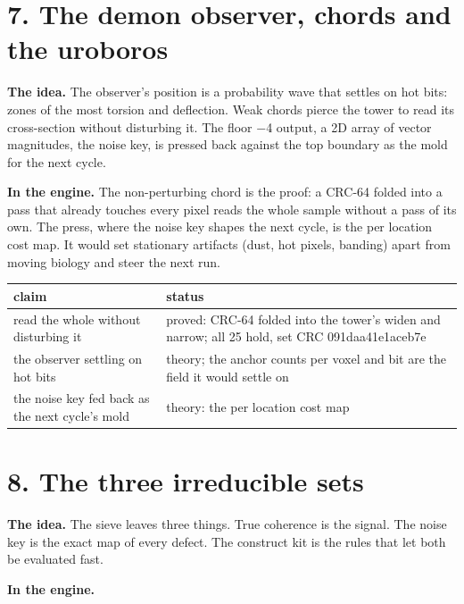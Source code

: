 \section{\texorpdfstring{7. The demon observer, chords and the uroboros}{7. The demon observer, chords and the uroboros}}

\textbf{The idea.} The observer's position is a probability wave that settles on hot bits: zones of the most torsion and deflection. Weak chords pierce the tower to read its cross-section without disturbing it. The floor −4 output, a 2D array of vector magnitudes, the noise key, is pressed back against the top boundary as the mold for the next cycle.

\textbf{In the engine.} The non-perturbing chord is the proof: a CRC-64 folded into a pass that already touches every pixel reads the whole sample without a pass of its own. The press, where the noise key shapes the next cycle, is the per location cost map. It would set stationary artifacts (dust, hot pixels, banding) apart from moving biology and steer the next run.

{\small
\setlength{\tabcolsep}{6pt}
\begin{longtable}{>{\RaggedRight\arraybackslash}p{}>{\RaggedRight\arraybackslash}p{}}
\toprule
claim & status \\
\midrule
\endhead
read the whole without disturbing it & proved: CRC-64 folded into the tower's widen and narrow; all 25 hold, set CRC 091daa41e1aceb7e \\
the observer settling on hot bits & theory; the anchor counts per voxel and bit are the field it would settle on \\
the noise key fed back as the next cycle's mold & theory: the per location cost map \\
\bottomrule
\end{longtable}
}

\section{\texorpdfstring{8. The three irreducible sets}{8. The three irreducible sets}}

\textbf{The idea.} The sieve leaves three things. True coherence is the signal. The noise key is the exact map of every defect. The construct kit is the rules that let both be evaluated fast.

\textbf{In the engine.}

